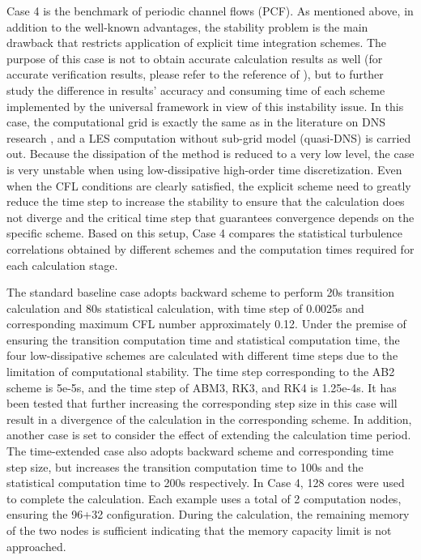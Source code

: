 \documentclass{article}
\begin{document}
Case 4 is the benchmark of periodic channel flows (PCF). As mentioned above, in addition to the well-known advantages, the stability problem is the main drawback that restricts application of explicit time integration schemes. The purpose of this case is not to obtain accurate calculation results as well (for accurate verification results, please refer to the reference of \citet{Guo:2023:arXiv}), but to further study the difference in results' accuracy and consuming time of each scheme implemented by the universal framework in view of this instability issue. In this case, the computational grid is exactly the same as in the literature on DNS research \citep{Kim:1987}, and a LES computation without sub-grid model (quasi-DNS) is carried out. Because the dissipation of the method is reduced to a very low level, the case is very unstable when using low-dissipative high-order time discretization. Even when the CFL conditions are clearly satisfied, the explicit scheme need to greatly reduce the time step to increase the stability to ensure that the calculation does not diverge and the critical time step that guarantees convergence depends on the specific scheme. Based on this setup, Case 4 compares the statistical turbulence correlations obtained by different schemes and the computation times required for each calculation stage.

The standard baseline case adopts backward scheme to perform 20s transition calculation and 80s statistical calculation, with time step of 0.0025s and corresponding maximum CFL number approximately 0.12. Under the premise of ensuring the transition computation time and statistical computation time, the four low-dissipative schemes are calculated with different time steps due to the limitation of computational stability. The time step corresponding to the AB2 scheme is 5e-5s, and the time step of ABM3, RK3, and RK4 is 1.25e-4s. It has been tested that further increasing the corresponding step size in this case will result in a divergence of the calculation in the corresponding scheme. In addition, another case is set to consider the effect of extending the calculation time period. The time-extended case also adopts backward scheme and corresponding time step size, but increases the transition computation time to 100s and the statistical computation time to 200s respectively.
In Case 4, 128 cores were used to complete the calculation. Each example uses a total of 2 computation nodes, ensuring the 96+32 configuration. During the calculation, the remaining memory of the two nodes is sufficient indicating that the memory capacity limit is not approached.
\end{document}
